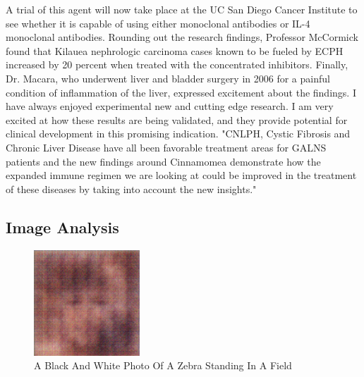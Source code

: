 \documentclass{article}%
\begin{document}
A trial of this agent will now take place at the UC San Diego Cancer Institute to see whether it is capable of using either monoclonal antibodies or IL{-}4 monoclonal antibodies.\newline%
Rounding out the research findings, Professor McCormick found that Kilauea nephrologic carcinoma cases known to be fueled by ECPH increased by 20 percent when treated with the concentrated inhibitors.\newline%
Finally, Dr. Macara, who underwent liver and bladder surgery in 2006 for a painful condition of inflammation of the liver, expressed excitement about the findings.\newline%
I have always enjoyed experimental new and cutting edge research. I am very excited at how these results are being validated, and they provide potential for clinical development in this promising indication.\newline%
"CNLPH, Cystic Fibrosis and Chronic Liver Disease have all been favorable treatment areas for GALNS patients and the new findings around Cinnamomea demonstrate how the expanded immune regimen we are looking at could be improved in the treatment of these diseases by taking into account the new insights."

%
\subsection{Image Analysis}%
\label{subsec:ImageAnalysis}%


\begin{figure}[h!]%
\centering%
\includegraphics[width=150px]{500_fake_images/samples_5_382.png}%
\caption{A Black And White Photo Of A Zebra Standing In A Field}%
\end{figure}

%
\end{document}
